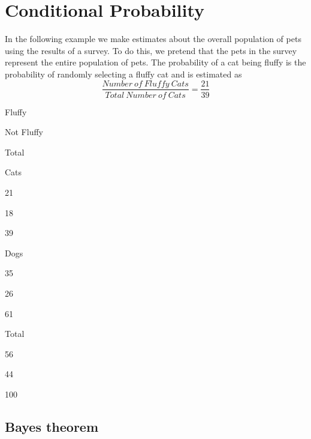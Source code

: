 \documentclass[]{book}
\begin{document}
\section{Conditional Probability}\label{conditional-probability}

In the following example we make estimates about the overall population
of pets using the results of a survey. To do this, we pretend that the
pets in the survey represent the entire population of pets. The
probability of a cat being fluffy is the probability of randomly
selecting a fluffy cat and is estimated as
\[\frac{Number \ of \ Fluffy \ Cats}{Total \ Number \ of \ Cats}=\frac{21}{39}\]

Fluffy

Not Fluffy

Total

Cats

21

18

39

Dogs

35

26

61

Total

56

44

100

\subsection{Bayes theorem}\label{bayes-theorem}


\end{document}
